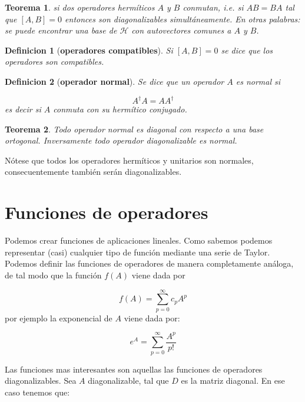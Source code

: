\documentclass[12pt,a4paper]{book}
\numberwithin{equation}{chapter}
\numberwithin{figure}{chapter}
\newtheorem{theorem}{Teorema}[section]
\newtheorem{definition}{Definicion}[section]
\begin{document}
\begin{theorem}
si dos operadores hermíticos $A$ y $B$ conmutan, i.e. si $AB = BA$ tal que $[A,B]=0$ entonces son diagonalizables simultáneamente. En otras palabras: se puede encontrar una base de $\mathcal{H}$ con autovectores comunes a $A$ y $B$. 
\end{theorem}

\begin{definition}[\textbf{operadores compatibles}]
Si $[A,B]=0$ se dice que los operadores son compatibles.
\end{definition}
\begin{definition}[\textbf{operador normal}] 
Se dice que un operador $A$ es normal si 
 
\begin{equation}
A^\dagger A = A A^\dagger
\end{equation}
es decir si $A$ conmuta con su hermítico conjugado. 
\end{definition}

\begin{theorem}
Todo operador normal es diagonal con respecto a una base ortogonal. Inversamente todo operador diagonalizable es normal.
\end{theorem}
Nótese que todos los operadores hermíticos y unitarios son normales, consecuentemente también serán diagonalizables. 


\section{Funciones de operadores}

Podemos crear funciones de aplicaciones lineales. Como sabemos podemos representar (casi) cualquier tipo de función mediante una serie de Taylor. Podemos definir las funciones de operadores de manera completamente análoga, de tal modo que la función $f(A)$ viene dada por

\begin{equation}
f(A) = \sum_{p=0}^\infty c_p A^p
\end{equation}
por ejemplo la exponencial de $A$ viene dada por:

\begin{equation}
e^A = \sum_{p=0}^\infty \frac{A^p}{p!}
\end{equation}

Las funciones mas interesantes son aquellas  las funciones de operadores diagonalizables. Sea $A$ diagonalizable, tal que $D$ es la matriz diagonal. En ese caso tenemos que:
\end{document}

